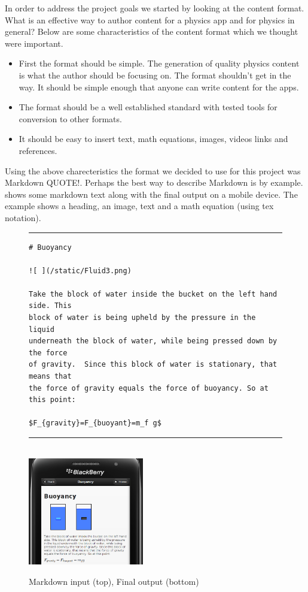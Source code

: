 \documentclass[12pt,a4paper]{article}  %
\begin{document}
In order to address the project goals we started by looking at the content
format. What is an effective way to author content for a physics app and for
physics in general? Below are some characteristics of the content format which
we thought were important.

\begin{itemize}
\item First the format should be simple. The generation of quality physics content is what the author should be focusing on. The format shouldn't get in the way. It should be simple enough that anyone can write content for the apps.
\item The format should be a well established standard with tested tools for conversion to other formats.
\item It should be easy to insert text, math equations, images, videos links and references.
\end{itemize}

Using the above charecteristics the format we decided to use for this project was Markdown QUOTE!. Perhaps the best way to describe Markdown is by example.  shows some markdown text along with the final output on a mobile device. The example shows a heading, an image, text and a math equation (using tex notation).

\begin{figure}[htb]
\rule[0.5ex]{1\columnwidth}{1pt}
\footnotesize
\begin{verbatim}
# Buoyancy

![ ](/static/Fluid3.png)

Take the block of water inside the bucket on the left hand side. This
block of water is being upheld by the pressure in the liquid
underneath the block of water, while being pressed down by the force
of gravity.  Since this block of water is stationary, that means that
the force of gravity equals the force of buoyancy. So at this point:

$F_{gravity}=F_{buoyant}=m_f g$
\end{verbatim}
\rule[0.5ex]{1\columnwidth}{1pt}
\\[2mm]
\centering
\includegraphics[width=0.45\textwidth]{buoyancy.png}
\caption{Markdown input (top), Final output (bottom)}
\label{fig:md}
\end{figure}
\end{document}
